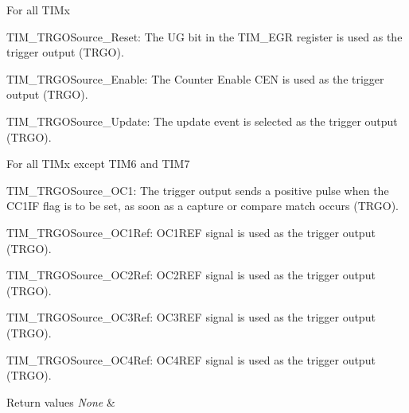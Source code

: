 \begin{DoxyItemize}
\item For all T\+I\+Mx \begin{DoxyItemize}
\item T\+I\+M\+\_\+\+T\+R\+G\+O\+Source\+\_\+\+Reset\+: The UG bit in the T\+I\+M\+\_\+\+E\+GR register is used as the trigger output (T\+R\+GO). \item T\+I\+M\+\_\+\+T\+R\+G\+O\+Source\+\_\+\+Enable\+: The Counter Enable C\+EN is used as the trigger output (T\+R\+GO). \item T\+I\+M\+\_\+\+T\+R\+G\+O\+Source\+\_\+\+Update\+: The update event is selected as the trigger output (T\+R\+GO).\end{DoxyItemize}

\item For all T\+I\+Mx except T\+I\+M6 and T\+I\+M7 \begin{DoxyItemize}
\item T\+I\+M\+\_\+\+T\+R\+G\+O\+Source\+\_\+\+O\+C1\+: The trigger output sends a positive pulse when the C\+C1\+IF flag is to be set, as soon as a capture or compare match occurs (T\+R\+GO). \item T\+I\+M\+\_\+\+T\+R\+G\+O\+Source\+\_\+\+O\+C1\+Ref\+: O\+C1\+R\+EF signal is used as the trigger output (T\+R\+GO). \item T\+I\+M\+\_\+\+T\+R\+G\+O\+Source\+\_\+\+O\+C2\+Ref\+: O\+C2\+R\+EF signal is used as the trigger output (T\+R\+GO). \item T\+I\+M\+\_\+\+T\+R\+G\+O\+Source\+\_\+\+O\+C3\+Ref\+: O\+C3\+R\+EF signal is used as the trigger output (T\+R\+GO). \item T\+I\+M\+\_\+\+T\+R\+G\+O\+Source\+\_\+\+O\+C4\+Ref\+: O\+C4\+R\+EF signal is used as the trigger output (T\+R\+GO).\end{DoxyItemize}

\begin{DoxyRetVals}{Return values}
{\em None} & \\
\hline
\end{DoxyRetVals}

\end{DoxyItemize}\mbox{\label{group___t_i_m___exported___functions_ga2f19ce1d90990691cf037e419ba08003}} 
